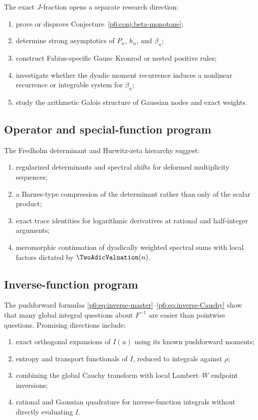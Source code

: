 \documentclass[11pt]{article}
\theoremstyle{definition}
\theoremstyle{remark}
\begin{document}
The exact \(J\)-fraction opens a separate research direction:

\begin{enumerate}
\item prove or disprove Conjecture~\ref{p6:conj:beta-monotone};
\item determine strong asymptotics of \(P_n\), \(h_n\), and \(\beta_n\);
\item construct Fabius-specific Gauss--Kronrod or nested positive rules;
\item investigate whether the dyadic moment recurrence induces a nonlinear recurrence or
      integrable system for \(\beta_n\);
\item study the arithmetic Galois structure of Gaussian nodes and exact weights.
\end{enumerate}

\subsection{Operator and special-function program}

The Fredholm determinant and Hurwitz-zeta hierarchy suggest:

\begin{enumerate}
\item regularized determinants and spectral shifts for deformed multiplicity sequences;
\item a Barnes-type compression of the determinant rather than only of the scalar product;
\item exact trace identities for logarithmic derivatives at rational and half-integer
      arguments;
\item meromorphic continuation of dyadically weighted spectral sums with local factors
      dictated by \(\TwoAdicValuation(n)\).
\end{enumerate}

\subsection{Inverse-function program}

The pushforward formulas \eqref{p6:eq:inverse-master}--\eqref{p6:eq:inverse-Cauchy} show that
many global integral questions about \(F^{-1}\) are easier than pointwise questions.
Promising directions include:

\begin{enumerate}
\item exact orthogonal expansions of \(I(u)\) using its known pushforward moments;
\item entropy and transport functionals of \(I\), reduced to integrals against \(\rho\);
\item combining the global Cauchy transform with local Lambert--\(W\) endpoint inversions;
\item rational and Gaussian quadrature for inverse-function integrals without directly
      evaluating \(I\).
\end{enumerate}
\end{document}

